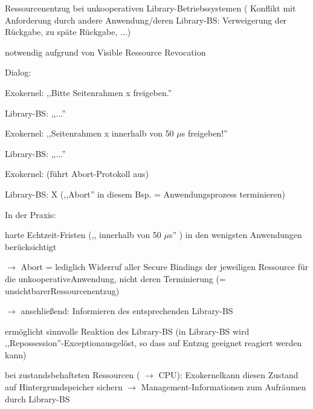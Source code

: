\documentclass[a4paper]{article}
\begin{document}
\begin{multicols}{3}
    \begin{itemize*}
        \item
        Ressourcenentzug bei unkooperativen Library-Betriebssystemen (
        Konflikt mit Anforderung durch andere Anwendung/deren Library-BS:
        Verweigerung der Rückgabe, zu späte Rückgabe, ...)
        \item
        notwendig aufgrund von Visible Ressource Revocation
        \item
        Dialog:
        \begin{itemize*}
            \item Exokernel: ,,Bitte Seitenrahmen x freigeben.''
            \item Library-BS: ,,...''
            \item Exokernel: ,,Seitenrahmen x innerhalb von 50 $\mu$s freigeben!''
            \item Library-BS: ,,...''
            \item Exokernel: (führt Abort-Protokoll aus)
            \item Library-BS: X (,,Abort'' in diesem Bsp. = Anwendungsprozess terminieren)
        \end{itemize*}
        \item
        In der Praxis:
        \begin{itemize*}
            \item harte Echtzeit-Fristen (,, innerhalb von 50 $\mu$s'' ) in den wenigsten Anwendungen berücksichtigt \begin{itemize*} \item $\rightarrow$ Abort = lediglich Widerruf aller Secure Bindings der jeweiligen Ressource für die unkooperativeAnwendung, nicht deren Terminierung (= unsichtbarerRessourcenentzug) \item $\rightarrow$ anschließend: Informieren des entsprechenden Library-BS \end{itemize*}
            \item ermöglicht sinnvolle Reaktion des Library-BS (in Library-BS wird ,,Repossession''-Exceptionausgelöst, so dass auf Entzug geeignet reagiert werden kann)
            \item bei zustandsbehafteten Ressourcen ( $\rightarrow$ CPU): Exokernelkann diesen Zustand auf Hintergrundspeicher sichern $\rightarrow$ Management-Informationen zum Aufräumen durch Library-BS
        \end{itemize*}
    \end{itemize*}



\end{multicols}
\end{document}
